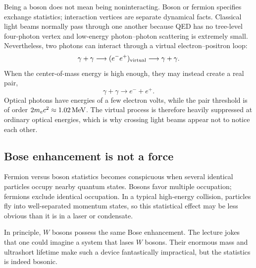 Being a boson does not mean being noninteracting. Boson or fermion specifies
exchange statistics; interaction vertices are separate dynamical facts.
Classical light beams normally pass through one another because QED has no
tree-level four-photon vertex and low-energy photon--photon scattering is
extremely small. Nevertheless, two photons can interact through a virtual
electron--positron loop:
\begin{equation}
  \gamma+\gamma
  \longrightarrow(e^-e^+)_{\rm virtual}
  \longrightarrow\gamma+\gamma.
\end{equation}
When the center-of-mass energy is high enough, they may instead create a real
pair,
\begin{equation}
  \gamma+\gamma\longrightarrow e^-+e^+.
\end{equation}
Optical photons have energies of a few electron volts, while the pair
threshold is of order \(2m_e c^2\approx1.02\,{\rm MeV}\). The virtual process
is therefore heavily suppressed at ordinary optical energies, which is why
crossing light beams appear not to notice each other.

\begin{classroomqa}
\end{classroomqa}

\subsection{Bose enhancement is not a force}

Fermion versus boson statistics becomes conspicuous when several identical
particles occupy nearby quantum states. Bosons favor multiple occupation;
fermions exclude identical occupation. In a typical high-energy collision,
particles fly into well-separated momentum states, so this statistical
effect may be less obvious than it is in a laser or condensate.

In principle, \(W\) bosons possess the same Bose enhancement. The lecture
jokes that one could imagine a system that lases \(W\) bosons. Their enormous
mass and ultrashort lifetime make such a device fantastically impractical,
but the statistics is indeed bosonic.

